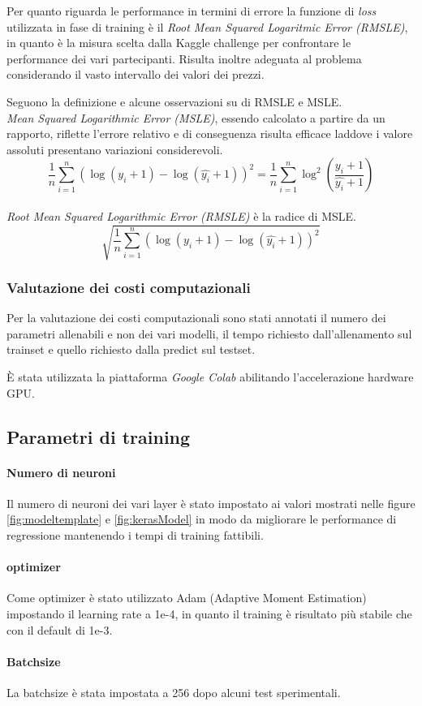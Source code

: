 Per quanto riguarda le performance in termini di errore la funzione di
\textit{loss} utilizzata in fase di training è il \textit{Root Mean Squared
Logaritmic Error (RMSLE)}, in quanto è la misura scelta dalla Kaggle challenge
per confrontare le performance dei vari partecipanti. Risulta inoltre
adeguata al problema considerando il vasto intervallo dei valori dei prezzi.

Seguono la definizione e alcune osservazioni su di RMSLE e MSLE.
\\
\textit{Mean Squared Logarithmic Error (MSLE)}, essendo calcolato a partire
da un rapporto, riflette l'errore relativo e di conseguenza risulta efficace
laddove i valore assoluti presentano variazioni considerevoli.
\begin{equation}
    \frac{1}{n}
        \sum_{i=1}^{n}
            ( \log(y_i+1) - \log(\hat{y_i}+1) )^2
    =
    \frac{1}{n}
        \sum_{i=1}^{n}
            \log^2(\frac{y_i+1}{\hat{y_i}+1})
\end{equation}
\\
\textit{Root Mean Squared Logarithmic Error (RMSLE)} è la radice di MSLE.
\begin{equation}
    \sqrt{ 
        \frac{1}{n}
            \sum_{i=1}^{n}
                ( \log(y_i+1) - \log(\hat{y_i}+1) )^2
    }
\end{equation}



\subsubsection{Valutazione dei costi computazionali}

Per la valutazione dei costi computazionali sono stati annotati il numero dei
parametri allenabili e non dei vari modelli, il tempo richiesto dall'allenamento
sul trainset e quello richiesto dalla predict sul testset.

È stata utilizzata la piattaforma \textit{Google Colab} abilitando l'accelerazione hardware GPU.


\subsection{Parametri di training}

\paragraph{Numero di neuroni} Il numero di neuroni dei vari layer è stato
impostato ai valori mostrati nelle figure \ref{fig:modeltemplate} e
\ref{fig:kerasModel} in modo da migliorare le performance di regressione
mantenendo i tempi di training fattibili.

\paragraph{optimizer} Come optimizer è stato utilizzato Adam (Adaptive Moment
Estimation) impostando il learning rate a 1e-4, in quanto il training è
risultato più stabile che con il default di 1e-3.

\paragraph{Batchsize} La batchsize è stata impostata a 256 dopo alcuni test sperimentali.
